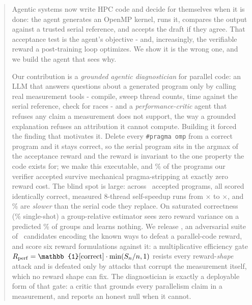 \begin{abstract}
Agentic systems now write HPC code and decide for themselves when it is done:
the agent generates an OpenMP kernel, runs it, compares the output against a
trusted serial reference, and accepts the draft if they agree. That
acceptance test is the agent's objective - and, increasingly, the verifiable
reward a post-training loop optimizes. We show it is the wrong one, and we
build the agent that sees why.

Our contribution is a \emph{grounded agentic diagnostician} for parallel code:
an LLM that answers questions about a generated program only by calling real
measurement tools - compile, sweep thread counts, time against the serial
reference, check for races - and a \emph{performance-critic} agent that refuses
any claim a measurement does not support, the way a grounded explanation refuses
an attribution it cannot compute. Building it forced the finding that motivates
it. Delete every \texttt{\#pragma omp} from a correct program and it stays
correct, so the serial program sits in the argmax of the acceptance reward and
the reward is invariant to the one property the code exists for; we make this
executable, and \SPRate\% of the programs our verifier accepted survive
mechanical pragma-stripping at exactly zero reward cost. The blind spot is
large: across \NAccepted\ accepted programs, all scored identically correct,
measured 8-thread self-speedup runs from \SpeedMin$\times$ to \SpeedMax$\times$,
and \BelowSerialRate\% are \emph{slower} than the serial code they replace. On
saturated correctness (\PassRate\% single-shot) a group-relative estimator sees
zero reward variance on a predicted \DeadGroupCorrEight\% of groups and learns
nothing. We release \PG, an adversarial suite of \NHacks\ candidates encoding
the known ways to defeat a parallel-code reward, and score six reward
formulations against it: a multiplicative efficiency gate
$\Rgate=\mathbb{1}[\text{correct}]\cdot\min(S_n/n,1)$ resists every
reward-\emph{shape} attack and is defeated only by attacks that corrupt the
measurement itself, which no reward shape can fix. The diagnostician is exactly
a deployable form of that gate: a critic that grounds every parallelism claim in
a measurement, and reports an honest null when it cannot.
\end{abstract}
